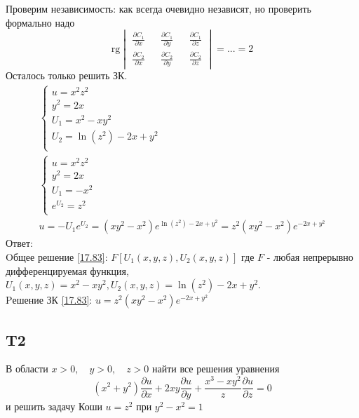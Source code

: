 \documentclass{article}
\newcommand{\rg}{\text{rg}}
\begin{document}
Проверим независимость: как всегда очевидно независят, но проверить формально надо
\begin{equation*}
    \rg \begin{vmatrix}
        \frac{\partial C_1}{\partial x} && \frac{\partial C_1}{\partial y} && \frac{\partial C_1}{\partial z}\\
        \frac{\partial C_2}{\partial x} && \frac{\partial C_2}{\partial y} && \frac{\partial C_2}{\partial z}
    \end{vmatrix} = ... = 2
\end{equation*}
Осталось только решить ЗК.
\begin{gather*}
\begin{cases}
        u=x^2z^2\\
        y^2=2x\\
        U_1=x^2-xy^2\\
        U_2=\ln (z^2) - 2x + y^2\\
    \end{cases}    \\
    \begin{cases}
        u=x^2z^2\\
        y^2=2x\\
        U_1=-x^2\\
        e^{U_2}=z^2\\
    \end{cases}    \\
    u=-U_1e^{U_2}=(xy^2 - x^2) e^{\ln (z^2) - 2x + y^2} = z^2(xy^2 - x^2) e^{- 2x + y^2}
\end{gather*}
Ответ:\\
 Oбщее решение \ref{17.83}: $F[U_1(x,y,z),U_2(x,y,z)]$ где $F$ - любая непрерывно дифференцируемая функция, $U_1(x,y,z)=x^2-xy^2, U_2(x,y,z)=\ln (z^2) - 2x + y^2$.\\
 Pешение ЗК \ref{17.83}: $u=z^2(xy^2 - x^2) e^{- 2x + y^2}$



\subsection{T2}
В области $x>0, \quad y>0, \quad z>0$ найти все решения уравнения
\begin{equation}\label{17.T2}
\left(x^{2}+y^{2}\right) \frac{\partial u}{\partial x}+2 x y \frac{\partial u}{\partial y}+\frac{x^{3}-x y^{2}}{z} \frac{\partial u}{\partial z}=0
\end{equation}
и решить задачу Коши $u=z^{2}$ при $y^{2}-x^{2}=1$\\
\end{document}
